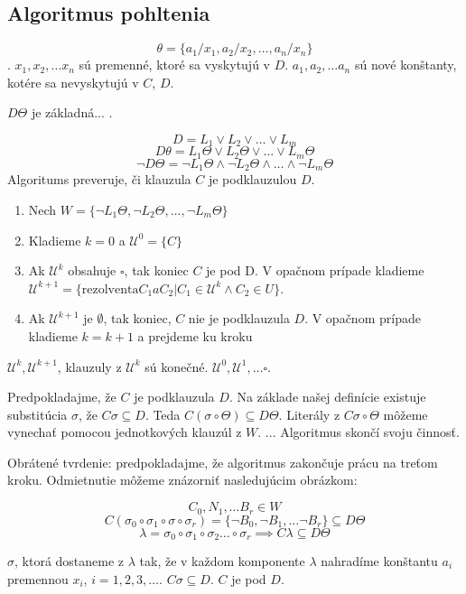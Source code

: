 \subsection{Algoritmus  pohltenia}
\startFIXME

$$\theta = \{ a_1 / x_1, a_2 / x_2, \ldots, a_n / x_n \}$$. $x_1, x_2, \ldots
x_n$ sú premenné, ktoré sa vyskytujú v $D$. $a_1, a_2, \ldots a_n$ sú nové
konštanty, kotére sa nevyskytujú v $C$, $D$.

$D\Theta$ je základná... .

$$D = L_1 \lor L_2 \lor \ldots \lor L_m$$
$$D \theta = L_1\Theta \lor L_2 \Theta \lor \ldots \lor L_m \Theta$$
$$\neg D\Theta = \neg L_1 \Theta \land \neg L_2 \Theta \land \ldots \land \neg
L_m \Theta$$
Algoritums preveruje, či klauzula $C$ je podklauzulou $D$.

\begin{enumerate}
    \item Nech $W = \{ \neg L_1 \Theta, \neg L_2 \Theta, \ldots, \neg L_m
    \Theta \}$

    \item Kladieme $k=0$ a $\mathcal{U}^0 = \{ C \}$
    \item Ak $\mathcal{U}^k$ obsahuje $\square$, tak koniec $C$ je pod D. V
    opačnom prípade kladieme $\mathcal{U}^{k+1} = \{ \mbox{rezolventa} C_1 a
    C_2 | C_1 \in \mathcal{U}^{k} \land C_2 \in U\}$. 
    \item Ak $\mathcal{U}^{k+1}$ je $\emptyset$, tak koniec, $C$ nie je
    podklauzula $D$. V opačnom prípade kladieme $k=k+1$ a prejdeme ku kroku

\end{enumerate}

\begin{poznamka}
    $\mathcal{U}^k, \mathcal{U}^{k+1}$, klauzuly z
    $\mathcal{U}^{k}$ sú konečné. $\mathcal{U}^0, \mathcal{U}^1, \ldots \square$.
\end{poznamka}

\begin{dokaz}
    Predpokladajme, že $C$ je podklauzula $D$. Na základe našej
    definície existuje substitúcia $\sigma$, že $C\sigma \subseteq D$. Teda
    $C(\sigma \circ \Theta) \subseteq D\Theta$. Literály z $C\sigma \circ \Theta$
    môžeme vynechať pomocou jednotkových klauzúl z $W$. ... Algoritmus skončí svoju
    činnosť.
    \par
    Obrátené tvrdenie: predpokladajme, že algoritmus zakončuje prácu na treťom
    kroku. Odmietnutie môžeme znázorniť nasledujúcim obrázkom:


    $$C_0, N_1 ,\ldots B_r \in W$$
    $$C(\sigma_0 \circ \sigma_1 \circ \sigma \circ \sigma_r) = \{ \neg B_0, \neg
    B_1, \ldots \neg B_r\} \subseteq D\Theta$$
    $$\lambda = \sigma_0 \circ \sigma_1 \circ \sigma_2 \ldots \circ \sigma_r \implies
    C \lambda \subseteq D\Theta$$

    $\sigma$, ktorá dostaneme z $\lambda$ tak, že v každom komponente $\lambda$
    nahradíme  konštantu $a_i$ premennou $x_i$, $i=1, 2, 3, \ldots$. $C\sigma
    \subseteq D$. $C$ je pod $D$.
\end{dokaz}

